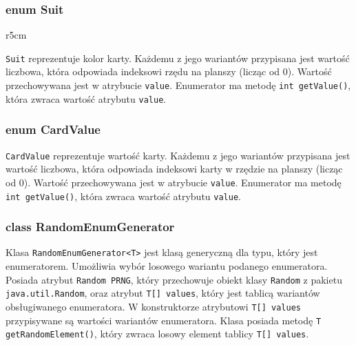 \documentclass{article}
\newenvironment{enum}[3][]%
{
\begin{classAndInterfaceCommon}{#1}{#2}{#3}
}%
{\node[umlcd style enum, anchor=north] (\umlcdClassName) at (\umlcdClassPos)
    {$<<$enumeration$>>$ \\ \textbf{\umlcdClassName}
\nodepart{second}
\umlcdClassAttributes
};
\end{classAndInterfaceCommon}
}
\begin{document}
\subsubsection*{enum Suit}

\setlength{\columnsep}{10pt}
\begin{wrapfigure}{r}{5cm}
    \centering
{}
\end{wrapfigure}

\texttt{Suit} reprezentuje kolor karty. Każdemu z jego wariantów przypisana jest wartość liczbowa, która odpowiada indeksowi rzędu na planszy (licząc od 0). Wartość przechowywana jest w atrybucie \texttt{value}. Enumerator ma metodę \texttt{int getValue()}, która zwraca wartość atrybutu \texttt{value}.

\subsubsection*{enum CardValue}
\texttt{CardValue} reprezentuje wartość karty. Każdemu z jego wariantów przypisana jest wartość liczbowa, która odpowiada indeksowi karty w rzędzie na planszy (licząc od 0). Wartość przechowywana jest w atrybucie \texttt{value}. Enumerator ma metodę \texttt{int getValue()}, która zwraca wartość atrybutu \texttt{value}.

\subsubsection*{class RandomEnumGenerator}

Klasa \texttt{RandomEnumGenerator<T>} jest klasą generyczną dla typu, który jest enumeratorem. Umożliwia wybór losowego wariantu podanego enumeratora. Posiada atrybut \texttt{Random PRNG}, który przechowuje obiekt klasy \texttt{Random} z pakietu \texttt{java.util.Random}, oraz atrybut \texttt{T[] values}, który jest tablicą wariantów obsługiwanego enumeratora. W konstruktorze atrybutowi \texttt{T[] values} przypisywane są wartości wariantów enumeratora. Klasa posiada metodę \texttt{T getRandomElement()}, który zwraca losowy element tablicy \texttt{T[] values}.
\end{document}
